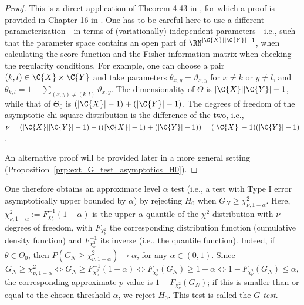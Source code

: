 \begin{proof}
This is a direct application of Theorem 4.43 in \cite{Bijma++2017}, for which a proof is
provided in Chapter 16 in \cite{Vandervaart1998}.
One has to be careful here to use a different parameterization---in
terms of (variationally) independent parameters---i.e.,
such that the parameter space contains an open part of $\RN^{|\C{X}||\C{Y}|-1}$,
when calculating the score function and the Fisher information matrix
when checking the regularity conditions.
For example, one can choose a pair $(k,l) \in \C{X} \times \C{Y}$ and take
parameters $\theta_{x,y} = \vartheta_{x,y}$ for $x \ne k$ or $y \ne l$, and
$\theta_{k,l} = 1 - \sum_{(x,y) \ne (k,l)} \vartheta_{x,y}$. 
The dimensionality of $\Theta$ is $|\C{X}||\C{Y}| - 1$, while
that of $\Theta_0$ is $(|\C{X}|-1) + (|\C{Y}|-1)$. The degrees
of freedom of the asymptotic chi-square distribution is the difference of the two, i.e.,
$\nu = (|\C{X}||\C{Y}|-1)   -   ((|\C{X}|-1) + (|\C{Y}|-1)) = (|\C{X}| - 1)(|\C{Y}| - 1)$.

An alternative proof will be provided later in a more general setting (Proposition~\ref{prp:ext_G_test_asymptotics_H0}).
\end{proof}

One therefore obtains an approximate level $\alpha$ test (i.e., a test with Type I error asymptotically upper bounded by $\alpha$) 
by rejecting $H_0$ when $G_N \ge \chi_{\nu,1-\alpha}^2$. Here,
$\chi^2_{\nu,1-\alpha} := F_{\chi^2_\nu}^{-1}(1-\alpha)$ is the upper $\alpha$ quantile of the $\chi^2$-distribution with $\nu$ degrees of freedom, with $F_{\chi^2_\nu}$ the corresponding distribution function (cumulative density function) and $F^{-1}_{\chi^2_\nu}$ its inverse (i.e., the quantile function).
Indeed, if $\theta \in \Theta_0$, then $P(G_N \ge \chi_{\nu,1-\alpha}^2) \to \alpha$, for any $\alpha \in (0,1)$.
Since 
$$G_N \ge \chi_{\nu,1-\alpha}^2 \iff G_N \ge F_{\chi^2_\nu}^{-1}(1-\alpha) \iff F_{\chi^2_\nu}(G_N) \ge 1-\alpha \iff 1-F_{\chi^2_\nu}(G_N) \le \alpha,$$
the corresponding approximate $p$-value is $1 - F_{\chi^2_\nu}(G_N)$; if this is smaller than or equal to the chosen threshold $\alpha$, 
we reject $H_0$.
This test is called the \emph{$G$-test}.

